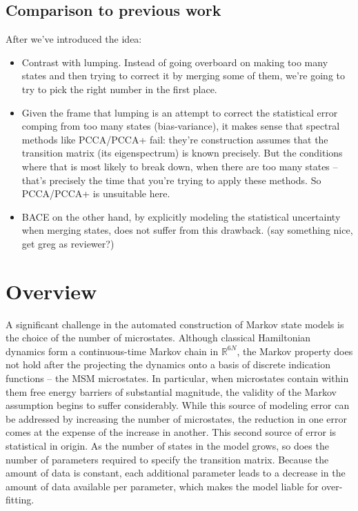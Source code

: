 \documentclass[twocolumn,floatfix,nofootinbib,aps]{revtex4-1}
\begin{document}
\subsection{Comparison to previous work}
After we've introduced the idea:
\begin{itemize}
\item Contrast with lumping. Instead of going overboard on making too many states and then trying to correct it by merging some of them, we're going to try to pick the right number in the first place.
\item Given the frame that lumping is an attempt to correct the statistical error comping from too many states (bias-variance), it makes sense that spectral methods like PCCA/PCCA+ fail: they're construction assumes that the transition matrix (its eigenspectrum) is known precisely. But the conditions where that is most likely to break down, when there are too many states  -- that's precisely the time that you're trying to apply these methods. So PCCA/PCCA+ is unsuitable here.
\item BACE on the other hand, by explicitly modeling the statistical uncertainty when merging states, does not suffer from this drawback. (say something nice, get greg as reviewer?)
\end{itemize}


\section{Overview}

A significant challenge in the automated construction of Markov state
models is the choice of the number of microstates. Although classical Hamiltonian dynamics form a continuous-time Markov chain in $\mathbb{R}^{6N}$, the Markov property does not hold after the projecting the dynamics onto a basis of discrete indication functions -- the MSM microstates. In particular, when microstates contain within them free energy barriers of substantial magnitude, the validity of the Markov assumption begins to suffer considerably. While this source of modeling error can be addressed by increasing the number of microstates, the reduction in one error comes at the expense of the increase in another. This second source of error is statistical in origin. As the number of states in the model grows, so does the number of parameters required to specify the transition matrix. Because the amount of data is constant, each additional parameter leads to a decrease in the amount of data available per
parameter, which makes the model liable for over-fitting.
\end{document}
